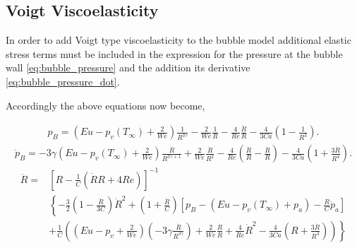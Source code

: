 \subsection{Voigt Viscoelasticity}
In order to add Voigt type viscoelasticity to the bubble model additional elastic stress terms must be included in the expression for the pressure at the bubble wall \eqref{eq:bubble_pressure} and the addition its derivative \eqref{eq:bubble_pressure_dot}.

Accordingly the above equations now become,

\begin{align}\label{eq:bubble_pressure_V}
 p_B = \left(Eu-p_v(T_\infty)+\frac{2}{We}\right)\frac{1}{R^{3\gamma}}-\frac{2}{We}\frac{1}{R} -\frac{4}{Re}\frac{\dot{R}}{R}-\frac{4}{3 Ca}\left(1-\frac{1}{R^3}\right).
\end{align}
\begin{align}\label{eq:bubble_pressure_dot_V}
  \dot{p}_B = -3\gamma \left(Eu-p_v(T_\infty)+\frac{2}{We}\right)\frac{\dot{R}}{R^{3\gamma+1}}+\frac{2}{We}\frac{\dot{R}}{R^2}
 -\frac{4}{Re}\left(\frac{\ddot{R}}{R}-\frac{\dot{R}}{R}\right)-\frac{4}{3 Ca}\left(1+\frac{3\dot{R}}{R^4}\right).
\end{align}
\begin{align}\label{eq:bubble_accleration_V}
  \ddot{R} =&\left[R-\frac{1}{C}(\dot{R}{R}+4 Re)\right]^{-1}\nonumber \\ 
            &\left\{-\frac{3}{2}\left(1-\frac{\dot{R}}{3 C}\right) \dot{R}^2 + \left(1+\frac{\dot{R}}{C}\right) \left[p_B- (Eu-p_v(T_\infty)+p_a) -  \frac{R}{C}\dot{p}_a\right] \right.\\
            &\left.+\frac{1}{C} \left((Eu-p_v+\frac{2}{We})(-3\gamma\frac{\dot{R}}{R^{3\gamma}})+\frac{2}{We}\frac{\dot{R}}{R}+\frac{4}{Re}\dot{R}^2-\frac{4}{3 Ca}\left(R+\frac{3\dot{R}}{R^3}\right)\right)\right\}\nonumber
\end{align}
